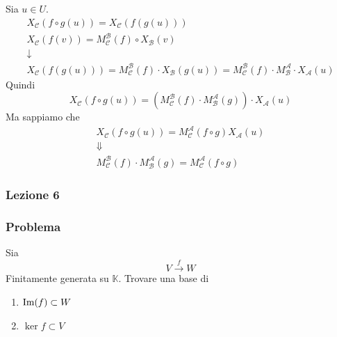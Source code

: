\begin{dimostrazione}
    Sia $u\in U$.
    \begin{gather}
        X_{\mathscr{C}}(f\circ g(u)) = X_{\mathscr{C}}(f(g(u))) \\
        X_{\mathscr{C}}(f(v))=M_{\mathscr{C}}^{\mathscr{B}}(f)\circ X_{\mathscr{B}}(v) \\
        \downarrow \\
        X_{\mathscr{C}}(f(g(u))) = M_{\mathscr{C}}^{\mathscr{B}}(f) \cdot X_{\mathscr{B}}(g(u)) = M_{\mathscr{C}}^{\mathscr{B}}(f)\cdot M_{\mathscr{B}}^{\mathscr{A}}\cdot X_{\mathscr{A}}(u)
    \end{gather}
    Quindi
    \begin{equation}
        X_{\mathscr{C}}(f\circ g(u))=(M_{\mathscr{C}}^{\mathscr{B}}(f)\cdot M_{\mathscr{B}}^{\mathscr{A}}(g))\cdot X_{\mathscr{A}}(u)
    \end{equation}
    Ma sappiamo che
    \begin{gather}
        X_{\mathscr{C}}(f\circ g(u))=M_{\mathscr{C}}^{\mathscr{A}}(f\circ g)X_{\mathscr{A}}(u) \\
        \Downarrow \\
        M_{\mathscr{C}}^{\mathscr{B}}(f)\cdot M_{\mathscr{B}}^{\mathscr{A}}(g)=M_{\mathscr{C}}^{\mathscr{A}}(f\circ g)
    \end{gather}
\end{dimostrazione}

\subsubsection{Lezione 6}
\subsubsection{Problema}

Sia 
\begin{equation}
    V\xrightarrow{f} W
\end{equation}
Finitamente generata su $\mathbb{K}$. \newline
Trovare una base di
\begin{enumerate}
    \item $\text{Im}(f)\subset W$ \\
    \item $\ker f \subset V$
\end{enumerate}

